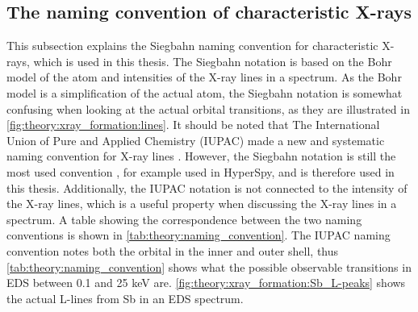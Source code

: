 \subsection{The naming convention of characteristic X-rays}
\label{theory:xray_formation:naming}



This subsection explains the Siegbahn naming convention for characteristic X-rays, which is used in this thesis.
The Siegbahn notation is based on the Bohr model of the atom and intensities of the X-ray lines in a spectrum.
As the Bohr model is a simplification of the actual atom, the Siegbahn notation is somewhat confusing when looking at the actual orbital transitions, as they are illustrated in \cref{fig:theory:xray_formation:lines}.
It should be noted that The International Union of Pure and Applied Chemistry (IUPAC) made a new and systematic naming convention for X-ray lines \cite{IUPAC_nomenclature1991}.
However, the Siegbahn notation is still the most used convention \cite[Ch. 4.2.4]{goldstein_scanning_2018}, for example used in HyperSpy, and is therefore used in this thesis.
Additionally, the IUPAC notation is not connected to the intensity of the X-ray lines, which is a useful property when discussing the X-ray lines in a spectrum.
A table showing the correspondence between the two naming conventions is shown in \cref{tab:theory:naming_convention}.
The IUPAC naming convention notes both the orbital in the inner and outer shell, thus \cref{tab:theory:naming_convention} shows what the possible observable transitions in EDS between 0.1 and 25 keV are.
\cref{fig:theory:xray_formation:Sb_L-peaks} shows the actual L-lines from Sb in an EDS spectrum.



